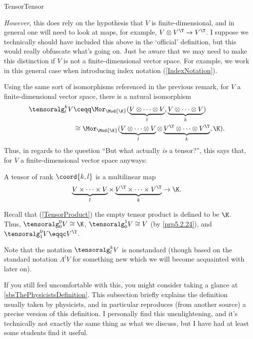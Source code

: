 \begin{dfn}{Tensor}{Tensor}
\begin{rmk}
		\emph{However}, this does rely on the hypothesis that $V$ is finite-dimensional, and in general one will need to look at maps, for example, $V\otimes V^{\T}\rightarrow V^{\T}$.  I suppose we technically should have included this above in the `official' definition, but this would really obfuscate what's going on.  Just be aware that we may need to make this distinction if $V$ is not a finite-dimensional vector space.  For example, we work in this general case when introducing index notation (\cref{IndexNotation}).
	\end{rmk}
	\begin{rmk}
		Using the same sort of isomorphisms referenced in the previous remark, for $V$ a finite-dimensional vector space, there is a natural isomorphism
		\begin{equation*}
			\begin{split}
				\tensoralg _l^kV & \ceqq \Mor _{\Mod{\K}}(\underbrace{V\otimes \cdots \otimes V}_l,\underbrace{V\otimes \cdots \otimes V}_k) \\
				& \cong \Mor _{\Mod{\K}}(\underbrace{V\otimes \cdots \otimes V}_l\otimes \underbrace{V^{\T}\otimes \cdots \otimes V^{\T}}_k,\K ).
			\end{split}
		\end{equation*}
		Thus, in regards to the question ``But what actually \emph{is} a tensor?'', this says that, for $V$ a finite-dimensional vector space anyways:
		\begin{important}
			A tensor of rank $\coord{k,l}$ is a multilinear map
			\begin{equation*}
				\underbrace{V\times \cdots \times V}_l\times \underbrace{V^{\T}\times \cdots \times V^{\T}}_k\rightarrow \K .
			\end{equation*}
		\end{important}
	\end{rmk}
	\begin{rmk}
		Recall that (\cref{TensorProduct}) the empty tensor product is defined to be $\K$.  Thus, $\tensoralg _0^0V\cong \K$, $\tensoralg _0^1V\cong V$ (by \cref{prp5.2.24}), and $\tensoralg _1^0V\eqqc V^{\T}$.
	\end{rmk}
	\begin{rmk}
		Note that the notation $\tensoralg _l^kV$ is nonstandard (though based on the standard notation $\Lambda ^lV$ for something new which we will become acquainted with later on).
	\end{rmk}
	\begin{rmk}
		If you still feel uncomfortable with this, you might consider taking a glance at \cref{sbsThePhysicistsDefinition}.  This subsection briefly explains the definition usually taken by physicists, and in particular reproduces (from another source) a precise version of this definition.  I personally find this unenlightening, and it's technically not exactly the same thing as what we discuss, but I have had at least some students find it useful.
	\end{rmk}
\end{dfn}
